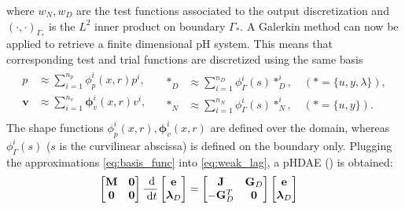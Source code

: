 \documentclass[aspectratio=169]{ISAE-Beamer}
\begin{document}
\begin{frame}
		where $w_N, w_D$ are the test functions associated to the output discretization and $\left( \cdot, \cdot \right)_{\Gamma_{*}}$ is the $L^2$ inner product on boundary $\Gamma_*$. A Galerkin method can now be applied to retrieve a finite dimensional pH system. This means that corresponding test and trial functions are discretized using the same basis
	\begin{equation}
	\label{eq:basis_func}
	\begin{aligned}
	\begin{aligned}
	p &\approx \sum_{i=1}^{n_p} \phi_p^i(x, r) p^i, \\
	\bm{v} &\approx \sum_{i=1}^{n_v} \bm\phi_v^i(x, r) v^i, \\
	\end{aligned} \quad
	\begin{aligned}
	*_D &\approx \sum_{i=1}^{n_D} \phi^i_\Gamma(s) *^i_D, \quad (* = \{u, y, \lambda\}), \\
	*_N &\approx \sum_{i=1}^{n_N} \phi_\Gamma^i(s) *^i_N, \quad (* = \{u,  y\}).
	\end{aligned} 
	\end{aligned}
	\end{equation}
	The shape functions $\phi_p^i(x, r), \bm\phi_v^i(x, r)$ are defined over the domain, whereas $\phi_\Gamma^i(s)$ ($s$ is the curvilinear abscissa) is defined on the boundary only. Plugging the approximations \eqref{eq:basis_func} into \eqref{eq:weak_lag}, a pHDAE (\cite{beattie2018linear}) is obtained:
	\begin{equation}
	\begin{aligned}
	\label{eq:discr_phdae}
	\begin{bmatrix}
	\mathbf{M} & \mathbf{0} \\
	\mathbf{0} & \mathbf{0} \\
	\end{bmatrix} \frac{\d}{\d t}
	\begin{bmatrix}
	\mathbf{e}\\
	\bm{\lambda}_D \\
	\end{bmatrix}
	&= \begin{bmatrix}
	\mathbf{J} & \mathbf{G}_D\\
	-\mathbf{G}_D^T & \mathbf{0} \\
	\end{bmatrix}
	\begin{bmatrix}
	\mathbf{e}\\
	\bm{\lambda}_D \\

\end{bmatrix}
\end{aligned}
\end{equation}
\end{frame}
\end{document}
